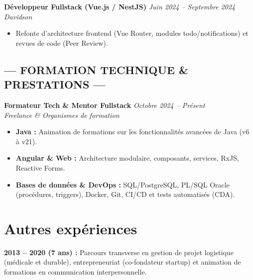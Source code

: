 \documentclass[a4paper,10pt]{article}
\newcommand{\cvtext}{\fontsize{9}{11}\selectfont}
\begin{document}
\begin{minipage}[t]{0.68\textwidth}
\begin{tcolorbox}[cvbox, width=\linewidth, fontupper=\cvtext]
    \textcolor{bleu}{\textbf{Développeur Fullstack (Vue.js / NestJS)}} \hfill \textit{Juin 2024 -- Septembre 2024}\\
    \textit{Davidson}
    \begin{itemize}[leftmargin=*]
      \item Refonte d'architecture frontend (Vue Router, modules todo/notifications) et revues de code (Peer Review).
    \end{itemize}

    \vspace{0.4em}
    \subsection*{--- FORMATION TECHNIQUE \& PRESTATIONS ---}
    \vspace{0.3em}

    \textcolor{bleu}{\textbf{Formateur Tech \& Mentor Fullstack}} \hfill \textit{Octobre 2024 -- Présent}\\
    \textit{Freelance \& Organismes de formation}
    \begin{itemize}[leftmargin=*]
      \item \textbf{Java :} Animation de formations sur les fonctionnalités avancées de Java (v6 à v21).
      \item \textbf{Angular \& Web :} Architecture modulaire, composants, services, RxJS, Reactive Forms.
      \item \textbf{Bases de données \& DevOps :} SQL/PostgreSQL, PL/SQL Oracle (procédures, triggers), Docker, Git, CI/CD et tests automatisés (CDA).
    \end{itemize}
    \vspace{0.8em}
\end{tcolorbox}

\section*{Autres expériences}
\begin{tcolorbox}[cvbox, width=\linewidth, fontupper=\cvtext]
  \textbf{2013 -- 2020 (7 ans) :} Parcours transverse en gestion de projet logistique (médicale et durable), entrepreneuriat (co-fondateur startup) et animation de formations en communication interpersonnelle.
\end{tcolorbox}

\end{minipage}
\end{document}
